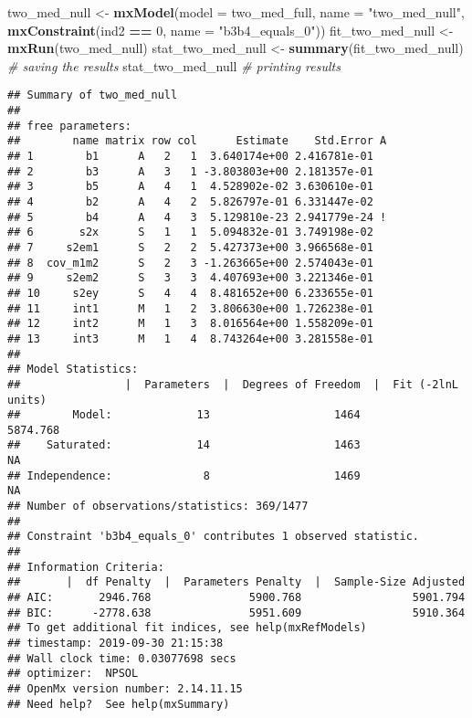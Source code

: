 \documentclass[11pt,]{article}
\newenvironment{Shaded}{\begin{snugshade}}{\end{snugshade}}
\newcommand{\CommentTok}[1]{\textcolor[rgb]{0.56,0.35,0.01}{\textit{#1}}}
\newcommand{\DataTypeTok}[1]{\textcolor[rgb]{0.13,0.29,0.53}{#1}}
\newcommand{\DecValTok}[1]{\textcolor[rgb]{0.00,0.00,0.81}{#1}}
\newcommand{\KeywordTok}[1]{\textcolor[rgb]{0.13,0.29,0.53}{\textbf{#1}}}
\newcommand{\NormalTok}[1]{#1}
\newcommand{\OperatorTok}[1]{\textcolor[rgb]{0.81,0.36,0.00}{\textbf{#1}}}
\newcommand{\StringTok}[1]{\textcolor[rgb]{0.31,0.60,0.02}{#1}}
\begin{document}
\begin{Shaded}
\begin{Highlighting}[]
\NormalTok{two_med_null <-}\StringTok{ }\KeywordTok{mxModel}\NormalTok{(}\DataTypeTok{model =}\NormalTok{ two_med_full,}
                        \DataTypeTok{name =} \StringTok{"two_med_null"}\NormalTok{,}
                        \KeywordTok{mxConstraint}\NormalTok{(ind2 }\OperatorTok{==}\StringTok{ }\DecValTok{0}\NormalTok{, }\DataTypeTok{name =} \StringTok{"b3b4_equals_0"}\NormalTok{))}
\NormalTok{fit_two_med_null <-}\StringTok{ }\KeywordTok{mxRun}\NormalTok{(two_med_null)}
\NormalTok{stat_two_med_null <-}\StringTok{ }\KeywordTok{summary}\NormalTok{(fit_two_med_null) }\CommentTok{# saving the results}
\NormalTok{stat_two_med_null }\CommentTok{# printing results }
\end{Highlighting}
\end{Shaded}

\begin{verbatim}
## Summary of two_med_null 
##  
## free parameters:
##        name matrix row col      Estimate    Std.Error A
## 1        b1      A   2   1  3.640174e+00 2.416781e-01  
## 2        b3      A   3   1 -3.803803e+00 2.181357e-01  
## 3        b5      A   4   1  4.528902e-02 3.630610e-01  
## 4        b2      A   4   2  5.826797e-01 6.331447e-02  
## 5        b4      A   4   3  5.129810e-23 2.941779e-24 !
## 6       s2x      S   1   1  5.094832e-01 3.749198e-02  
## 7     s2em1      S   2   2  5.427373e+00 3.966568e-01  
## 8  cov_m1m2      S   2   3 -1.263665e+00 2.574043e-01  
## 9     s2em2      S   3   3  4.407693e+00 3.221346e-01  
## 10     s2ey      S   4   4  8.481652e+00 6.233655e-01  
## 11     int1      M   1   2  3.806630e+00 1.726238e-01  
## 12     int2      M   1   3  8.016564e+00 1.558209e-01  
## 13     int3      M   1   4  8.743264e+00 3.281558e-01  
## 
## Model Statistics: 
##                |  Parameters  |  Degrees of Freedom  |  Fit (-2lnL units)
##        Model:             13                   1464              5874.768
##    Saturated:             14                   1463                    NA
## Independence:              8                   1469                    NA
## Number of observations/statistics: 369/1477
## 
## Constraint 'b3b4_equals_0' contributes 1 observed statistic. 
## 
## Information Criteria: 
##       |  df Penalty  |  Parameters Penalty  |  Sample-Size Adjusted
## AIC:       2946.768               5900.768                 5901.794
## BIC:      -2778.638               5951.609                 5910.364
## To get additional fit indices, see help(mxRefModels)
## timestamp: 2019-09-30 21:15:38 
## Wall clock time: 0.03077698 secs 
## optimizer:  NPSOL 
## OpenMx version number: 2.14.11.15 
## Need help?  See help(mxSummary)
\end{verbatim}
\end{document}
